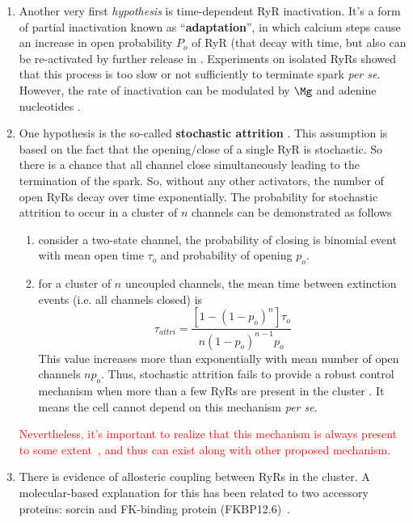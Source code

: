 \begin{enumerate}
\item Another very first {\it hypothesis} is time-dependent RyR inactivation.
It's a form of partial inactivation known as ``{\bf adaptation}'', in which
calcium steps cause an increase in open probability $P_o$ of RyR (that decay
with time, but also can be re-activated by further release in 
\citep{gyorke1993ryr}. Experiments on isolated RyRs showed that this process is
too slow or not sufficiently to terminate spark {\it per se}. However, the rate
of inactivation can be modulated by $\Mg$ and adenine nucleotides
\citep{valdivia1995, xu1996}. 

\item One hypothesis is the so-called {\bf stochastic attrition}
\citep{stern1992tec}.
  This assumption is based on the fact that the opening/close of a single RyR is
  stochastic. So there is a chance that all channel close simultaneously leading
  to the termination of the spark. So, without any other activators, the number
  of open RyRs decay over time exponentially. The probability for stochastic
  attrition to occur in a cluster of $n$ channels can be demonstrated as follows
  \begin{enumerate}
  \item consider a two-state channel, the probability of closing is
    binomial event with mean open time $\tau_o$ and probability of
    opening $p_o$.
  \item for a cluster of $n$ uncoupled channels, the mean time between
    extinction events (i.e. all channels closed) is
    \begin{equation}
      \label{eq:932}
      \tau_{attri} = \frac{\left[1-(1-p_o)^n\right]\tau_o}{n(1-p_o)^{n-1}p_o}
    \end{equation}
    This value increases more than exponentially with mean number of open
    channels $np_o$. Thus, stochastic attrition
  fails to provide a robust control mechanism when more than a few RyRs are
  present in the cluster \citep{stern1999lcm}. 
  It means the cell cannot depend on this mechanism {\it per se}.
  
  \end{enumerate}
  \textcolor{red}{Nevertheless, it's important to realize that this
    mechanism is always present to some extent~\citep{stern1999lcm},
    and thus can exist along with other proposed mechanism}.

\item There is evidence of allosteric coupling between RyRs in the
  cluster. A molecular-based explanation for this has been related to two
  accessory proteins: sorcin and FK-binding protein
  (FKBP12.6)~\citep{valdivia1998}.


\end{enumerate}
